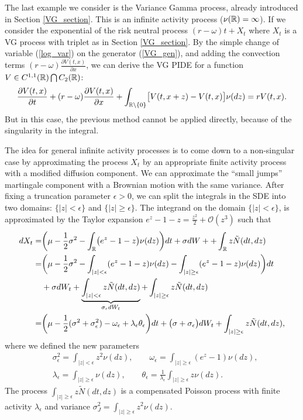 The last example we consider is the Variance Gamma process, already introduced in Section \ref{VG_section}. This is an infinite activity process
($\nu(\mathbb{R}) = \infty$). 
If we consider the exponential of the risk neutral process $(r-\omega)t + X_t$ where $X_t$ is a VG process with triplet as in Section \ref{VG_section}.
By the simple change of variable (\ref{log_var}) on the generator (\ref{VG_gen}), and adding the convection terms 
$(r-\omega) \frac{\partial V(t,x)}{\partial x}$, we can derive the VG PIDE for a function $V \in C^{1,1}(\mathbb{R}) \bigcap C_2(\mathbb{R})$:
\begin{equation} \label{VG_PIDE}
 \frac{\partial V(t,x)}{\partial t} + (r-\omega) \frac{\partial V(t,x)}{\partial x}
 + \int_{\mathbb{R} \backslash \{0\}} \bigl[ V(t,x+z) - V(t,x) \bigr] \nu(dz) = rV(t,x) .
\end{equation}
But in this case, the previous method cannot be applied directly, because of the singularity in the integral.

The idea for general infinite activity processes is to come down to a non-singular case by approximating the process $X_t$ by an
appropriate finite activity process with a modified diffusion component.
We can approximate the ``small jumps'' martingale component with a Brownian motion with the same variance.
After fixing a truncation parameter $\epsilon >0$, we can split the integrals in the SDE into two domains: $\{|z|<\epsilon\}$ and $\{|z|\geq \epsilon\}$.
The integrand on the domain $\{ |z|<\epsilon \}$, is approximated by the Taylor expansion 
 $e^z-1-z = \frac{z^2}{2} + \mathcal{O}(z^3)$ such that
\begin{align}\label{log_sde_inf_act}\nonumber
  dX_t =& \biggl( \mu-\frac{1}{2}\sigma^2 - \int_{\mathbb{R}} \bigl( e^z-1-z \bigr) \nu(dz) \biggr)dt + \sigma dW + + \int_{\mathbb{R}} z \tilde N(dt,dz) \\ \nonumber
       =& \biggl( \mu - \frac{1}{2}\sigma^2 -\int_{|z|<\epsilon} (e^z-1-z) \nu(dz) -\int_{|z|\geq \epsilon} (e^z-1-z) \nu(dz)  \biggr) dt\\ \nonumber
        &+ \sigma dW_t + \underbrace{\int_{|z|< \epsilon} z \tilde N(dt,dz)}_{\sigma_{\epsilon} dW_t} + \int_{|z| \geq \epsilon} z \tilde N(dt,dz) \\ 
       =& \biggl( \mu - \frac{1}{2} (\sigma^2 + \sigma_{\epsilon}^2) - \omega_{\epsilon} + \lambda_{\epsilon} \theta_{\epsilon}  \biggr) dt + \bigl( \sigma+\sigma_{\epsilon}\bigr) dW_t 
       + \int_{|z|\geq \epsilon} z \tilde N(dt,dz) ,
\end{align}
where we defined the new parameters
\begin{align}\label{sig_eps}
 & \sigma_{\epsilon}^2 =  \int_{|z| < \epsilon} z^2 \nu(dz), \quad \quad \omega_{\epsilon} = \int_{|z| \geq \epsilon} (e^z-1) \nu(dz), \\ \nonumber
 & \lambda_{\epsilon} =  \int_{|z| \geq \epsilon} \nu(dz), \quad \quad \theta_{\epsilon} = \frac{1}{\lambda_{\epsilon}} \int_{|z| \geq \epsilon} z \nu(dz) .
\end{align}
The process $\int_{|z|\geq \epsilon} z \tilde N(dt,dz)$ is a compensated Poisson process with finite activity $\lambda_{\epsilon}$ 
and variance $\sigma_J^2 = \int_{|z| \geq \epsilon} z^2 \nu(dz) $.


